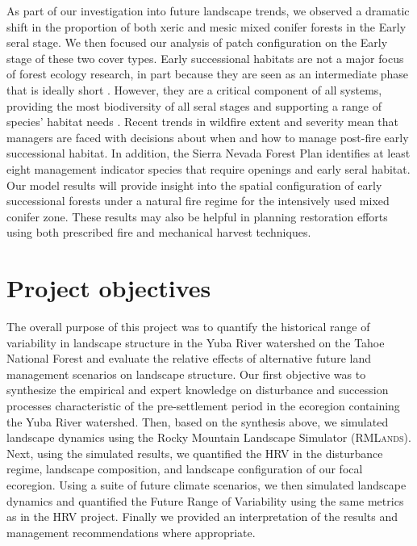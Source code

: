 As part of our investigation into future landscape trends, we observed a dramatic shift in the proportion of both xeric and mesic mixed conifer forests in the Early seral stage. We then focused our analysis of patch configuration on the Early stage of these two cover types. Early successional habitats are not a major focus of forest ecology research, in part because they are seen as an intermediate phase that is ideally short \citep{Swanson2011}. However, they are a critical component of all systems, providing the most biodiversity of all seral stages and supporting a range of species' habitat needs \citep{Chang1995,Hutto2008,Swanson2011}. Recent trends in wildfire extent and severity mean that managers are faced with decisions about when and how to manage post-fire early successional habitat. In addition, the Sierra Nevada Forest Plan identifies at least eight management indicator species that require openings and early seral habitat. Our model results will provide insight into the spatial configuration of early successional forests under a natural fire regime for the intensively used mixed conifer zone. These results may also be helpful in planning restoration efforts using both prescribed fire and mechanical harvest techniques.


\section{Project objectives}

The overall purpose of this project was to quantify the historical range of variability in landscape structure in the Yuba River watershed on the Tahoe National Forest and evaluate the relative effects of alternative future land management scenarios on landscape structure. Our first objective was to synthesize the empirical and expert knowledge on disturbance and succession processes characteristic of the pre-settlement period in the ecoregion containing the Yuba River watershed. Then, based on the synthesis above, we simulated landscape dynamics using the Rocky Mountain Landscape Simulator (\textsc{RMLands}). Next, using the simulated results, we quantified the HRV in the disturbance regime, landscape composition, and landscape configuration of our focal ecoregion. Using a suite of future climate scenarios, we then simulated landscape dynamics and quantified the Future Range of Variability using the same metrics as in the HRV project. Finally we provided an interpretation of the results and management recommendations where appropriate.





